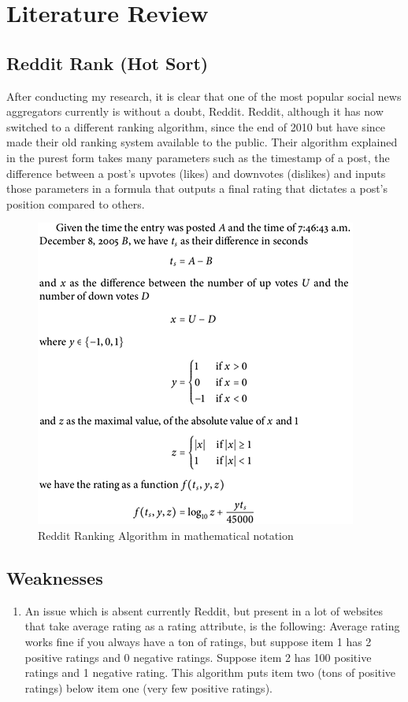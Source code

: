 \section{Literature Review}
\subsection {Reddit Rank (Hot Sort)}
After conducting my research, it is clear that one of the most popular social news aggregators currently is without a doubt, Reddit. Reddit, although it has now switched to a different ranking algorithm, since the end of 2010 but have since made their old ranking system available to the public. Their algorithm explained in the purest form takes many parameters such as the timestamp of a post, the difference between a post’s upvotes (likes) and downvotes (dislikes) and inputs those parameters in a formula that outputs a final rating that dictates a post’s position compared to others.

\begin{figure}[h]
 \begin{center}
	 \includegraphics{Figures/reddit_rank}
 \end{center}
 \caption{Reddit Ranking Algorithm in mathematical notation}
\end{figure}

\subsection {Weaknesses}
\begin{enumerate}
  \item An issue which is absent currently Reddit, but present in a lot of websites that take average rating as a rating attribute, is the following: Average rating works fine if you always have a ton of ratings, but suppose item 1 has 2 positive ratings and 0 negative ratings. Suppose item 2 has 100 positive ratings and 1 negative rating. This algorithm puts item two (tons of positive ratings) below item one (very few positive ratings).
\end{enumerate}

